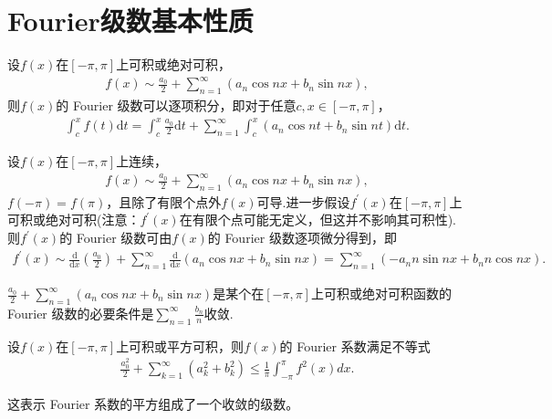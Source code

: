 \documentclass[../../main.tex]{subfiles}
\begin{document}
\section{Fourier级数基本性质}

\begin{theorem}[Fourier级数的逐项积分定理]\label{theorem:Fourier级数的逐项积分定理}
设$f(x)$在$[-\pi,\pi]$上可积或绝对可积，
\begin{align*}
f(x)\sim\frac{a_0}{2}+\sum_{n = 1}^{\infty}(a_n\cos nx + b_n\sin nx),
\end{align*}
则$f(x)$的 Fourier 级数可以逐项积分，即对于任意$c,x\in[-\pi,\pi]$，
\begin{align*}
\int_{c}^{x}f(t)\mathrm{d}t=\int_{c}^{x}\frac{a_0}{2}\mathrm{d}t+\sum_{n = 1}^{\infty}\int_{c}^{x}(a_n\cos nt + b_n\sin nt)\mathrm{d}t.
\end{align*}
\end{theorem}

\begin{theorem}[Fourier级数的逐项微分定理]\label{theorem:Fourier级数的逐项微分定理}
设$f(x)$在$[-\pi,\pi]$上连续，
\begin{align*}
f(x)\sim\frac{a_0}{2}+\sum_{n = 1}^{\infty}(a_n\cos nx + b_n\sin nx),
\end{align*}
$f(-\pi)=f(\pi)$，且除了有限个点外$f(x)$可导.进一步假设$f^{\prime}(x)$在$[-\pi,\pi]$上可积或绝对可积(注意：$f^{\prime}(x)$在有限个点可能无定义，但这并不影响其可积性). 则$f^{\prime}(x)$的 Fourier 级数可由$f(x)$的 Fourier 级数逐项微分得到，即
\begin{align*}
f^{\prime}(x)\sim\frac{\mathrm{d}}{\mathrm{d}x}\left(\frac{a_0}{2}\right)+\sum_{n = 1}^{\infty}\frac{\mathrm{d}}{\mathrm{d}x}(a_n\cos nx + b_n\sin nx)=\sum_{n = 1}^{\infty}(-a_nn\sin nx + b_nn\cos nx).
\end{align*}
\end{theorem}

\begin{corollary}
$\frac{a_0}{2}+\sum_{n = 1}^{\infty}(a_n\cos nx + b_n\sin nx)$是某个在$[-\pi,\pi]$上可积或绝对可积函数的 Fourier 级数的必要条件是$\sum_{n = 1}^{\infty}\frac{b_n}{n}$收敛. 
\end{corollary}

\begin{theorem}[Bessel不等式]\label{theorem:Bessel不等式}
设$f(x)$在$[-\pi,\pi]$上可积或平方可积，则$f(x)$的 Fourier 系数满足不等式
\begin{align*}
\frac{a_0^2}{2}+\sum_{k = 1}^{\infty}(a_k^2 + b_k^2)\leq\frac{1}{\pi}\int_{-\pi}^{\pi}f^2(x)dx.
\end{align*}
\end{theorem}
\begin{note}
这表示 Fourier 系数的平方组成了一个收敛的级数。
\end{note}
\end{document}
